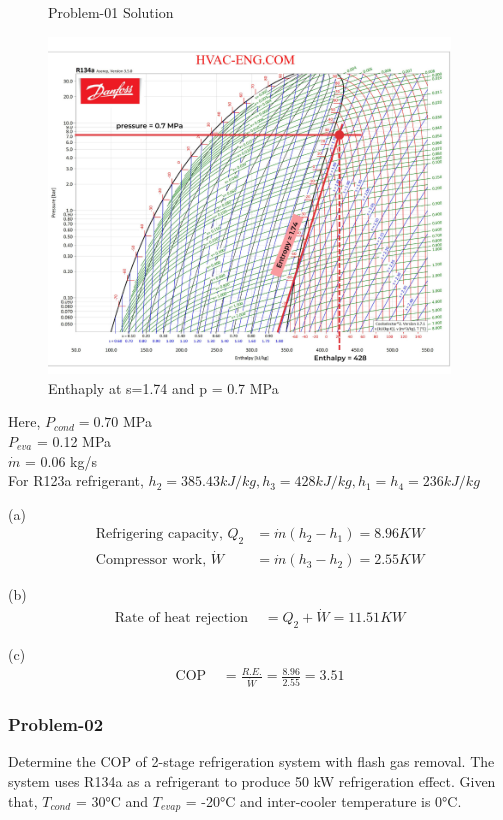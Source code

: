 \documentclass{article}
\begin{document}
\begin{figure}
  
  \caption{Problem-01 Solution}
  \label{fig:problem}
\end{figure}

\begin{figure}[h]
  \includegraphics[width=0.95\textwidth]{img/prb-01c.jpeg}
  \caption{Enthaply at s=1.74  and p = 0.7 MPa}
\end{figure}

Here, $P_{cond} = 0.70 $ MPa \\
$P_{eva}$ = 0.12 MPa \\
$\dot{m}$ = 0.06 kg/s \\
For R123a refrigerant,
$h_2=385.43 kJ/kg , h_3 = 428 kJ/kg, h_1 = h_4 = 236 kJ/kg$

(a) 
\begin{align*}
  \text{Refrigering capacity, } Q_2 &= \dot{m}(h_2-h_1) = 8.96 KW \\
  \text{Compressor work, } \dot{W} &= \dot{m}(h_3-h_2) = 2.55 KW 
\end{align*}

(b) 
\begin{align*}
  \text{Rate of heat rejection }&= Q_2 + \dot{W} = 11.51 KW 
\end{align*}

(c) 
\begin{align*}
  \text{COP } &= \frac{R.E.}{\dot{W}} =\frac{8.96}{2.55} = 3.51 
\end{align*}

\subsubsection*{Problem-02}
Determine the COP of 2-stage refrigeration system with flash gas removal. The system uses R134a as a refrigerant to produce 50 kW refrigeration effect. Given that, $T_{cond}$ = 30°C and $T_{evap}$ = -20°C and inter-cooler temperature is 0°C. 
\end{document}

